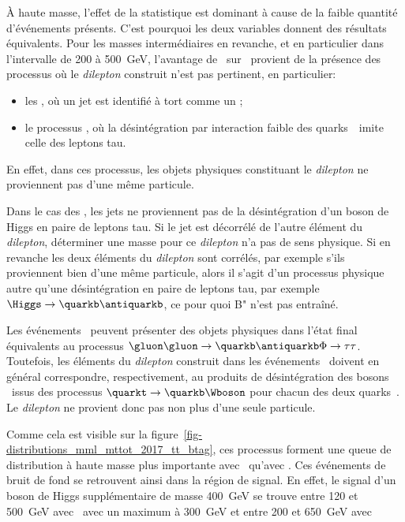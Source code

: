 \par
À haute masse,
l'effet de la statistique est dominant
à cause de la faible quantité d'événements présents.
C'est pourquoi les deux variables donnent des résultats équivalents.
Pour les masses intermédiaires en revanche,
et en particulier dans l'intervalle de \num{200} à \SI{500}{\GeV},
l'avantage de \mTtot\ sur \mml\ provient de la présence des processus où
le \emph{dilepton} construit n'est pas pertinent,
en particulier:
\begin{itemize}
\item les \ftauhs, où un jet est identifié à tort comme un \tauh;
\item le processus \ttbar, où la désintégration par interaction faible des quarks~\quarkt\ imite celle des leptons tau.
\end{itemize}
En effet, dans ces processus,
les objets physiques constituant le \emph{dilepton}
ne proviennent pas d'une même particule.
\par
Dans le cas des \ftauhs,
les jets ne proviennent pas de la désintégration d'un boson de Higgs en paire de leptons tau.
Si le jet est décorrélé de l'autre élément du \emph{dilepton},
déterminer une masse pour ce \emph{dilepton} n'a pas de sens physique.
Si en revanche les deux éléments du \emph{dilepton} sont corrélés,
par exemple s'ils proviennent bien d'une même particule,
alors il s'agit d'un processus physique autre qu'une désintégration en paire de leptons tau,
par exemple $\Higgs\to\quarkb\antiquarkb$,
ce pour quoi B" n'est pas entraîné.
\par
Les événements \ttbar\ peuvent présenter des objets physiques dans l'état final équivalents
au processus $\gluon\gluon\to\quarkb\antiquarkb\Phi\to\tau\tau$.
Toutefois, les éléments du \emph{dilepton} construit dans les événements \ttbar\
doivent en général correspondre, respectivement, au produits de désintégration des bosons \Wboson\ issus des processus
$\quarkt\to\quarkb\Wboson$ pour chacun des deux quarks~\quarkt.
Le \emph{dilepton} ne provient donc pas non plus d'une seule particule.
\par
Comme cela est visible sur la figure~\ref{fig-distributions_mml_mttot_2017_tt_btag},
ces processus forment une queue de distribution à haute masse plus importante avec \mml\ qu'avec \mTtot.
Ces événements de bruit de fond se retrouvent ainsi dans la région de signal.
En effet, le signal d'un boson de Higgs supplémentaire de masse \SI{400}{\GeV} se trouve
entre \num{120} et \SI{500}{\GeV} avec \mTtot\
avec un maximum à \SI{300}{\GeV}
et
entre \num{200} et \SI{650}{\GeV} avec \mml\
